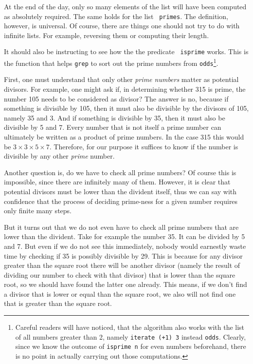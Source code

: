 \documentclass[a4paper,landscape,twocolumn]{report}
\begin{document}
At the end of the day, only so many elements of the list will have been
computed as absolutely required. The same holds for the list {\tt
primes}.
The definition, however, is universal. Of course, there are things one
should not try to do with infinite lists. For example, reversing them or
computing their length.

It should also be instructing to see how the the predicate {\tt
isprime} works. This is the function that helps {\tt grep} to sort out
the prime numbers from {\tt odds}\footnote{
Careful readers will have
noticed, that the algorithm also works with the list of all numbers
greater than 2, namely {\tt iterate (+1) 3} instead {\tt odds}. Clearly,
since we know the outcome of {\tt isprime n} for even numbers
beforehand, there is no point in actually carrying out those
computations.}.

First, one must understand that only other {\em prime numbers} matter as
potential divisors. For example, one might ask if, in determining
whether
315 is prime, the number 105 needs to be considered as divisor? The
answer is no, because if something is divisible by 105, then it must
also be divisible by the divisors of 105, namely 35 and 3. And if
something is divisible by 35, then it must also be divisible by 5 and 7.
Every number that is not itself a prime number
can ultimately be written as a
product of prime numbers. In the case 315 this would be
$3\times 3\times 5\times 7$.
Therefore, for
our purpose it suffices to know if the number is divisible by any other
\emph{prime} number.

Another question is, do we have to check all prime numbers? Of course this is impossible, since there are infinitely many of them. However, it is clear that potential divisors must be lower than the divident itself, thus we can say with confidence that the process of deciding prime-ness for a given number requires only finite many steps.

But it turns out that we do not even have to check all prime numbers that are lower than the divident.
Take for example the number 35. It can be divided by 5
and 7. But even if we do not see this immediately, nobody would earnestly
waste time by checking if 35 is possibly divisible by 29.
This is because for any divisor greater than the square root
there will be
another divisor (namely the result of dividing our number to check with
that divisor) that is lower than the square root, so we should have
found the latter one already. This means, if we don't find a divisor
that
is lower or equal than the square root, we also will not find one that
is greater than the square root.
\end{document}
